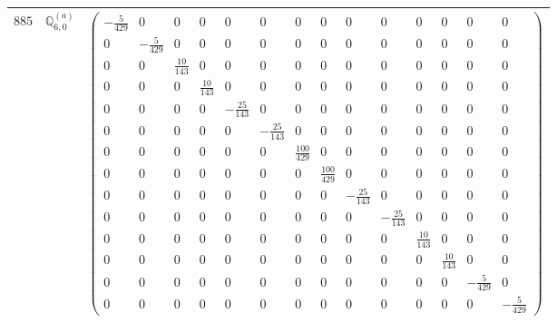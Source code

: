 \documentclass[fleqn,8pt,landscape]{jsarticle}
\begin{document}
\begin{center}
\begin{longtable}{ccc}
$ 885 $ & $ \mathbb{Q}_{6,0}^{(a)} $ & $ \begin{pmatrix} - \frac{5}{429} & 0 & 0 & 0 & 0 & 0 & 0 & 0 & 0 & 0 & 0 & 0 & 0 & 0 \\ 0 & - \frac{5}{429} & 0 & 0 & 0 & 0 & 0 & 0 & 0 & 0 & 0 & 0 & 0 & 0 \\ 0 & 0 & \frac{10}{143} & 0 & 0 & 0 & 0 & 0 & 0 & 0 & 0 & 0 & 0 & 0 \\ 0 & 0 & 0 & \frac{10}{143} & 0 & 0 & 0 & 0 & 0 & 0 & 0 & 0 & 0 & 0 \\ 0 & 0 & 0 & 0 & - \frac{25}{143} & 0 & 0 & 0 & 0 & 0 & 0 & 0 & 0 & 0 \\ 0 & 0 & 0 & 0 & 0 & - \frac{25}{143} & 0 & 0 & 0 & 0 & 0 & 0 & 0 & 0 \\ 0 & 0 & 0 & 0 & 0 & 0 & \frac{100}{429} & 0 & 0 & 0 & 0 & 0 & 0 & 0 \\ 0 & 0 & 0 & 0 & 0 & 0 & 0 & \frac{100}{429} & 0 & 0 & 0 & 0 & 0 & 0 \\ 0 & 0 & 0 & 0 & 0 & 0 & 0 & 0 & - \frac{25}{143} & 0 & 0 & 0 & 0 & 0 \\ 0 & 0 & 0 & 0 & 0 & 0 & 0 & 0 & 0 & - \frac{25}{143} & 0 & 0 & 0 & 0 \\ 0 & 0 & 0 & 0 & 0 & 0 & 0 & 0 & 0 & 0 & \frac{10}{143} & 0 & 0 & 0 \\ 0 & 0 & 0 & 0 & 0 & 0 & 0 & 0 & 0 & 0 & 0 & \frac{10}{143} & 0 & 0 \\ 0 & 0 & 0 & 0 & 0 & 0 & 0 & 0 & 0 & 0 & 0 & 0 & - \frac{5}{429} & 0 \\ 0 & 0 & 0 & 0 & 0 & 0 & 0 & 0 & 0 & 0 & 0 & 0 & 0 & - \frac{5}{429} \end{pmatrix} $ \\ \hline

\end{longtable}
\end{center}
\end{document}
